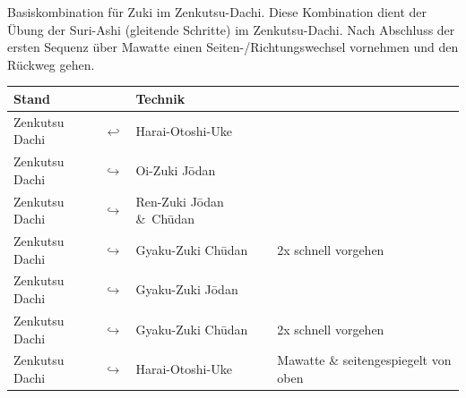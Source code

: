 \documentclass[a5paper,landscape,DIV=calc,11pt,notitlepage]{scrartcl}
\begin{document}
\pagebreak
\begin{tcolorbox}[colback=white,colframe=GKD,coltitle=white,adjusted title=Zuki Kata aus dem Japan Karate-D\={o} Jinen-Kai]
	\null\vfill\null
	\begin{center}
		\parbox{\textwidth-2\tabcolsep}{Basiskombination für Zuki im Zenkutsu-Dachi. Diese Kombination dient der Übung der Suri-Ashi (gleitende Schritte) im Zenkutsu-Dachi. Nach Abschluss der ersten Sequenz über Mawatte einen Seiten-/Richtungswechsel vornehmen und den Rückweg gehen.}
	\end{center}
	\begin{tabularx}{\textwidth}{lllX}
		Stand	&&Technik	&\\
		\midrule
		Zenkutsu Dachi 	& \(\hookleftarrow\) & Harai-Otoshi-Uke	&\\
		Zenkutsu Dachi 	& \(\hookrightarrow\) & Oi-Zuki J\={o}dan	&\\
		Zenkutsu Dachi 	& \(\hookrightarrow\) & Ren-Zuki J\={o}dan \&~Ch\={u}dan	&\\
		Zenkutsu Dachi 	& \(\hookrightarrow\) & Gyaku-Zuki Ch\={u}dan	&2x schnell vorgehen\\
		Zenkutsu Dachi 	& \(\hookrightarrow\) & Gyaku-Zuki J\={o}dan	&\\
		Zenkutsu Dachi 	& \(\hookrightarrow\) & Gyaku-Zuki Ch\={u}dan	&2x schnell vorgehen\\
		Zenkutsu Dachi 	& \(\hookrightarrow\) & Harai-Otoshi-Uke	& Mawatte \& seitengespiegelt von oben\\
		\midrule
	\end{tabularx}\\\null\vfill\null
\end{tcolorbox}
\pagebreak
\end{document}
